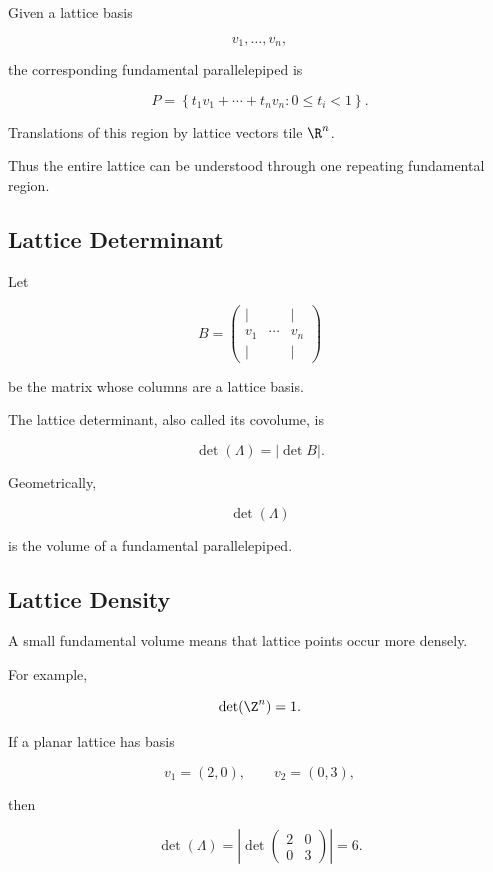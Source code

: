 Given a lattice basis

\[
v_1,\ldots,v_n,
\]

the corresponding fundamental parallelepiped is

\[
\boxed{
P=
\left\{
t_1v_1+\cdots+t_nv_n:
0\leq t_i<1
\right\}.
}
\]

Translations of this region by lattice vectors tile \(\R^n\).

Thus the entire lattice can be understood through one repeating fundamental
region.

\subsection{Lattice Determinant}
\label{subsec:lattice-determinant}

Let

\[
B=
\begin{pmatrix}
|&&|\\
v_1&\cdots&v_n\\
|&&|
\end{pmatrix}
\]

be the matrix whose columns are a lattice basis.

The lattice determinant, also called its covolume, is

\[
\boxed{
\det(\Lambda)=|\det B|.
}
\]

Geometrically,

\[
\det(\Lambda)
\]

is the volume of a fundamental parallelepiped.

\subsection{Lattice Density}
\label{subsec:lattice-density}

A small fundamental volume means that lattice points occur more densely.

For example,

\[
\det(\Z^n)=1.
\]

If a planar lattice has basis

\[
v_1=(2,0),
\qquad
v_2=(0,3),
\]

then

\[
\det(\Lambda)
=
\left|
\det
\begin{pmatrix}
2&0\\
0&3
\end{pmatrix}
\right|
=
6.
\]

